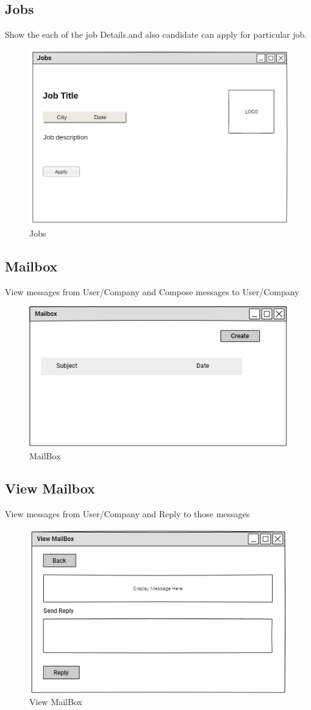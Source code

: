 \documentclass[a4paper,12pt]{report}
\begin{document}
\subsection {Jobs}
Show the each of the job Details.and also candidate can apply for particular job.
\begin{figure}[bph]
	\centering
	\includegraphics[width=.6\linewidth]{img/user/userappyjob}
	\caption{Jobs}
\end{figure}
\pagebreak

\subsection {Mailbox}
View messages from User/Company and Compose messages to User/Company
\begin{figure}[bph]
	\centering
	\includegraphics[width=.7\linewidth]{img/notification}
	\caption{MailBox}
\end{figure}


\subsection {View Mailbox}
View messages from User/Company and Reply to those messages
\begin{figure}[bph]
	\centering
	\includegraphics[width=.7\linewidth]{img/view_notifctn}
	\caption{View MailBox}
\end{figure}
\pagebreak
\end{document}
